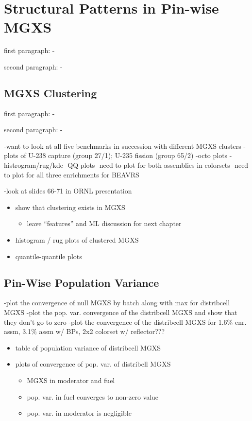 \chapter{Structural Patterns in Pin-wise MGXS}
\label{chap:spatial}

first paragraph: 
-

second paragraph:
-

\section{MGXS Clustering}

first paragraph:
-

second paragraph:
-

-want to look at all five benchmarks in succession with different MGXS clusters
  -plots of U-238 capture (group 27/1); U-235 fission (group 65/2)
    -octo plots
    -histrogram/rug/kde
    -QQ plots
-need to plot for both assemblies in colorsets
-need to plot for all three enrichments for BEAVRS
  
-look at slides 66-71 in ORNL presentation

\begin{itemize}[noitemsep]
  \item show that clustering exists in MGXS
  \begin{itemize}[noitemsep]
    \item leave ``features'' and ML discussion for next chapter
  \end{itemize}
  \item histogram / rug plots of clustered MGXS
  \item quantile-quantile plots  
\end{itemize}


\section{Pin-Wise Population Variance}

-plot the convergence of null MGXS by batch along with max for distribcell MGXS
-plot the pop. var. convergence of the distribcell MGXS and show that they don't go to zero
-plot the convergence of the distribcell MGXS for 1.6\% enr. assm, 3.1\% assm w/ BPs, 2x2 colorset w/ reflector???

\begin{itemize}[noitemsep]
  \item table of population variance of distribcell MGXS
  \item plots of convergence of pop. var. of distribell MGXS
  \begin{itemize}[noitemsep]
    \item MGXS in moderator and fuel
    \item pop. var. in fuel converges to non-zero value
    \item pop. var. in moderator is negligible
  \end{itemize}
\end{itemize}


